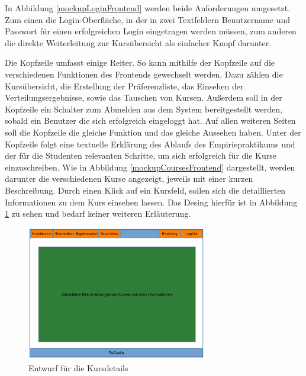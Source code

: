             In Abbildung \ref{mockupLoginFrontend} werden beide Anforderungen umgesetzt.
            Zum einen die Login-Oberfläche, in der in zwei Textfeldern Benutzername und Passwort für einen erfolgreichen Login eingetragen werden müssen, zum anderen die direkte Weiterleitung zur Kursübersicht als einfacher Knopf darunter.

            Die Kopfzeile umfasst einige Reiter.
            So kann mithilfe der Kopfzeile auf die verschiedenen Funktionen des Frontends gewechselt werden. 
            Dazu zählen die Kursübersicht, die Erstellung der Präferenzliste, das Einsehen der Verteilungsergebnisse, sowie das Tauschen von Kursen.
            Außerdem soll in der Kopfzeile ein Schalter zum Abmelden aus dem System bereitgestellt werden, sobald ein Benutzer die sich erfolgreich eingeloggt hat. 
            Auf allen weiteren Seiten soll die Kopfzeile die gleiche Funktion und das gleiche Aussehen haben.
            Unter der Kopfzeile folgt eine textuelle Erklärung des Ablaufs des Empiriepraktikums und der für die Studenten relevanten Schritte, um sich erfolgreich für die Kurse einzuschreiben.
            Wie in Abbildung \ref{mockupCoursesFrontend} dargestellt, werden darunter die verschiedenen Kurse angezeigt, jeweils mit einer kurzen Beschreibung.
            Durch einen Klick auf ein Kursfeld, sollen sich die detaillierten Informationen zu dem Kurs einsehen lassen.
            Das Desing hierfür ist in Abbildung \ref{mockupDetailsFrontend} zu sehen und bedarf keiner weiteren Erläuterung.
            \begin{figure}[t]
            	\centering
            	\includegraphics[width=0.7\textwidth]{./design/images/MockUpsFrontend/frontendCoursedetails.png}
            	\caption{Entwurf für die Kursdetails}
            	\label{mockupDetailsFrontend}
            \end{figure}
